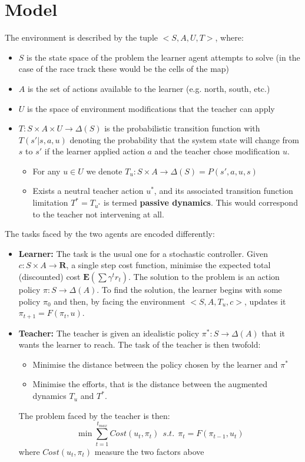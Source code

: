 \documentclass[letterpaper]{aamas2009}
\begin{document}
\section{Model}
The environment is described by the tuple $<S,A,U,T>$, where:
\begin{itemize}
\item $S$ is the state space of the problem the learner agent attempts
  to solve (in the case of the race track these would be the cells of
  the map)
\item $A$ is the set of actions available to the learner (e.g. north, south, etc.)
\item $U$ is the space of environment modifications that the teacher can apply
\item $T:S\times A\times U\rightarrow\Delta(S)$ is the probabilistic
  transition function with $T(s'|s,a,u)$ denoting the probability that
  the system state will change from $s$ to $s'$ if the learner applied
  action $a$ and the teacher chose modification $u$.
\begin{itemize}
\item For any $u\in U$ we denote $T_u:S\times A\rightarrow\Delta(S)=P(s',a,u,s)$
\item Exists a neutral teacher action $u^*$, and its associated
  transition function limitation $T^*=T_{u^*}$ is termed {\bf passive
    dynamics}. This would correspond to the teacher not intervening at all.
\end{itemize}
\end{itemize}

The tasks faced by the two agents are encoded differently:
\begin{itemize}
\item {\bf Learner:} The task is the usual one for a stochastic
  controller. Given $c:S\times A\rightarrow\mathbf{R}$, a single step
  cost function, minimise the expected total (discounted) cost
  $\mathbf{E}\left(\sum\gamma^tr_t\right)$. The solution to the
  problem is an action policy $\pi:S\rightarrow\Delta(A)$. To find the
  solution, the learner begins with some policy $\pi_0$ and then, by
  facing the environment $<S,A,T_u,c>$, updates it
  $\pi_{t+1}=F(\pi_t,u)$.
\item {\bf Teacher:} The teacher is given an idealistic policy
  $\pi^*:S\rightarrow\Delta(A)$ that it wants the learner to reach. The task of the teacher is then twofold:
\begin{itemize}
\item Minimise the distance between the policy chosen by the learner and $\pi^*$
\item Minimise the efforts, that is the distance between the augmented dynamics $T_u$ and $T^*$.
\end{itemize}
The problem faced by the teacher is then:
$$
\min\sum\limits_{t=1}^{t_{max}} Cost(u_t,\pi_t)\ \ s.t.\ \ \pi_t=F(\pi_{t-1},u_t)
$$
where $Cost(u_t,\pi_t)$ measure the two factors above
\end{itemize}
\end{document}
